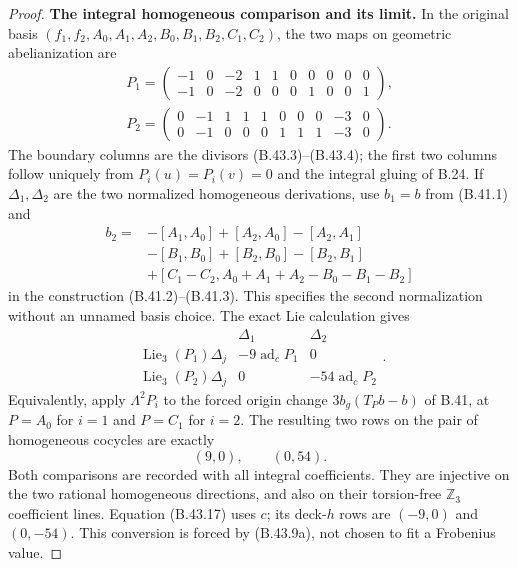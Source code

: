\begin{proof}
\par\smallskip\noindent\textbf{The integral homogeneous comparison and its limit.}
In the original basis $(f_1,f_2,A_0,A_1,A_2,B_0,B_1,B_2,C_1,C_2)$,
the two maps on geometric abelianization are
\[
 \begin{gathered}
 P_1=\begin{pmatrix}
 -1&0&-2&1&1&0&0&0&0&0\\
 -1&0&-2&0&0&0&1&0&0&1
 \end{pmatrix},\\[3pt]
 P_2=\begin{pmatrix}
 0&-1&1&1&1&0&0&0&-3&0\\
 0&-1&0&0&0&1&1&1&-3&0
 \end{pmatrix}.
 \end{gathered}                                             \tag{B.43.15}
\]
The boundary columns are the divisors (B.43.3)--(B.43.4);
the first two columns follow uniquely from
$P_i(u)=P_i(v)=0$ and the integral gluing of B.24.
If $\Delta_1,\Delta_2$ are the two normalized homogeneous
derivations, use $b_1=b$ from (B.41.1) and
\[
 \begin{split}
 b_2={}&-[A_1,A_0]+[A_2,A_0]-[A_2,A_1]\\
       &-[B_1,B_0]+[B_2,B_0]-[B_2,B_1]\\
       &+[C_1-C_2,A_0+A_1+A_2-B_0-B_1-B_2]
 \end{split}
\]
in the construction (B.41.2)--(B.41.3).  This specifies
the second normalization without an unnamed basis choice.
The exact Lie calculation gives
\[
 \begin{array}{c|cc}
 &\Delta_1&\Delta_2\\\hline
 \operatorname{Lie}_3(P_1)\Delta_j&-9\operatorname{ad}_c P_1&0\\
 \operatorname{Lie}_3(P_2)\Delta_j&0&-54\operatorname{ad}_c P_2
 \end{array}.                                               \tag{B.43.16}
\]
Equivalently, apply $\Lambda^2P_i$ to the forced origin
change $3b_g(T_Pb-b)$ of B.41, at $P=A_0$ for $i=1$ and
$P=C_1$ for $i=2$.  The resulting two rows on the pair
of homogeneous cocycles are exactly
\[
                  (9,0),\qquad(0,54).                       \tag{B.43.17}
\]
Both comparisons are recorded with all integral coefficients.
They are injective on the two rational homogeneous directions,
and also on their torsion-free $\mathbb Z_3$ coefficient lines.
Equation (B.43.17) uses $c$; its deck-$h$ rows are $(-9,0)$
and $(0,-54)$. This conversion is forced by (B.43.9a),
not chosen to fit a Frobenius value.


\end{proof}
